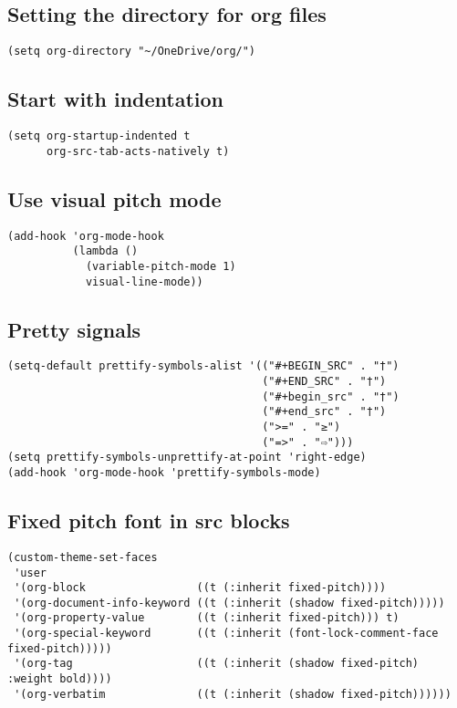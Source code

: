 \documentclass[11pt]{article}
\begin{document}
\subsection{Setting the directory for org files}
\label{sec:org369acba}
\begin{verbatim}
(setq org-directory "~/OneDrive/org/")
\end{verbatim}
\subsection{Start with indentation}
\label{sec:orgd3cd4f1}
\begin{verbatim}
(setq org-startup-indented t
      org-src-tab-acts-natively t)
\end{verbatim}
\subsection{Use visual pitch mode}
\label{sec:orgab4f479}
\begin{verbatim}
(add-hook 'org-mode-hook
          (lambda ()
            (variable-pitch-mode 1)
            visual-line-mode))
\end{verbatim}
\subsection{Pretty signals}
\label{sec:org224d93a}
\begin{verbatim}
(setq-default prettify-symbols-alist '(("#+BEGIN_SRC" . "†")
                                       ("#+END_SRC" . "†")
                                       ("#+begin_src" . "†")
                                       ("#+end_src" . "†")
                                       (">=" . "≥")
                                       ("=>" . "⇨")))
(setq prettify-symbols-unprettify-at-point 'right-edge)
(add-hook 'org-mode-hook 'prettify-symbols-mode)
\end{verbatim}
\subsection{Fixed pitch font in src blocks}
\label{sec:org0d06dcd}
\begin{verbatim}
(custom-theme-set-faces
 'user
 '(org-block                 ((t (:inherit fixed-pitch))))
 '(org-document-info-keyword ((t (:inherit (shadow fixed-pitch)))))
 '(org-property-value        ((t (:inherit fixed-pitch))) t)
 '(org-special-keyword       ((t (:inherit (font-lock-comment-face fixed-pitch)))))
 '(org-tag                   ((t (:inherit (shadow fixed-pitch) :weight bold))))
 '(org-verbatim              ((t (:inherit (shadow fixed-pitch))))))
\end{verbatim}
\end{document}
